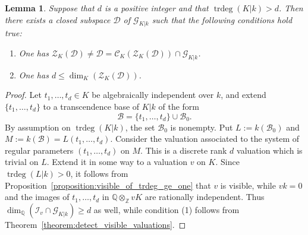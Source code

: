 \documentclass[12pt]{amsart}
\newcommand{\Zbb}{\mathbb{Z}}
\newcommand{\Qbb}{\mathbb{Q}}
\newcommand{\trdeg}{\operatorname{trdeg}}
\newcommand{\Bcal}{\mathcal{B}}
\newcommand{\Zcal}{\mathcal{Z}}
\newcommand{\Ccal}{\mathcal{C}}
\newcommand{\Gcal}{\mathcal{G}}
\newcommand{\Dcal}{\mathcal{D}}
\newcommand{\Ical}{\mathcal{I}}
\newtheorem{lemma}[theorem]{Lemma}
\theoremstyle{definition}
\begin{document}
\begin{lemma}\label{lemma:exists_subspace_of_trdeg_gt}
  Suppose that $d$ is a positive integer and that $\trdeg(K|k) > d$.
  Then there exists a closed subspace $\Dcal$ of $\Gcal_{K|k}$ such that the following conditions hold true:
  \begin{enumerate}
    \item One has $\Zcal_{K}(\Dcal) \neq \Dcal = \Ccal_{K}(\Zcal_{K}(\Dcal)) \cap \Gcal_{K|k}$.
    \item One has $d \le \dim_{K}(\Zcal_{K}(\Dcal))$.
  \end{enumerate}
\end{lemma}
\begin{proof}
  Let $t_{1},\ldots,t_{d} \in K$ be algebraically independent over $k$, and extend $\{t_{1},\ldots,t_{d}\}$ to a transcendence base of $K|k$ of the form
  \[ \Bcal = \{t_{1},\ldots,t_{d}\} \cup \Bcal_{0}. \]
  By assumption on $\trdeg(K|k)$, the set $\Bcal_{0}$ is nonempty.
  Put $L := k(\Bcal_{0})$ and $M := k(\Bcal) = L(t_{1},\ldots,t_{d})$.
  Consider the valuation associated to the system of regular parameters $(t_{1},\ldots,t_{d})$ on $M$. This is a discrete rank $d$ valuation which is trivial on $L$.
  Extend it in some way to a valuation $v$ on $K$.
  Since $\trdeg(L|k) > 0$, it follows from Proposition~\ref{proposition:visible_of_trdeg_ge_one} that $v$ is visible, while $vk = 0$ and the images of $t_{1},\ldots,t_{d}$ in $\Qbb \otimes_{\Zbb} vK$ are rationally independent.
  Thus $\dim_{\Qbb}(\Ical_{v} \cap \Gcal_{K|k}) \geq d$ as well, while condition (1) follows from Theorem~\ref{theorem:detect_visible_valuations}.
\end{proof}
\end{document}
